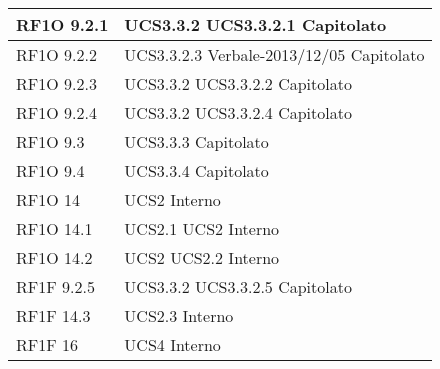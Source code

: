 \begin{center}
\begin{longtable}{ | p{5cm} | p{5cm} |}
        RF1O 9.2.1  &  UCS3.3.2 \newline  UCS3.3.2.1 \newline  Capitolato \newline  \\ \hline      
        RF1O 9.2.2  &  UCS3.3.2.3 \newline  Verbale-2013/12/05 \newline  Capitolato \newline  \\ \hline      
        RF1O 9.2.3 &  UCS3.3.2 \newline  UCS3.3.2.2 \newline  Capitolato \newline  \\ \hline      
        RF1O 9.2.4 &  UCS3.3.2 \newline  UCS3.3.2.4 \newline  Capitolato \newline  \\ \hline      
        RF1O 9.3 &  UCS3.3.3 \newline  Capitolato \newline  \\ \hline      
        RF1O 9.4 &  UCS3.3.4 \newline  Capitolato \newline  \\ \hline      
        RF1O 14 &  UCS2 \newline  Interno \newline  \\ \hline      
        RF1O 14.1 &  UCS2.1 \newline  UCS2 \newline  Interno \newline  \\ \hline      
        RF1O 14.2 &  UCS2 \newline  UCS2.2 \newline  Interno \newline  \\ \hline      
        RF1F 9.2.5 &  UCS3.3.2 \newline  UCS3.3.2.5 \newline  Capitolato \newline  \\ \hline      
        RF1F 14.3 &  UCS2.3 \newline  Interno \newline  \\ \hline      
        RF1F 16 &  UCS4 \newline  Interno \newline  \\ \hline      

\end{longtable}
\end{center}

